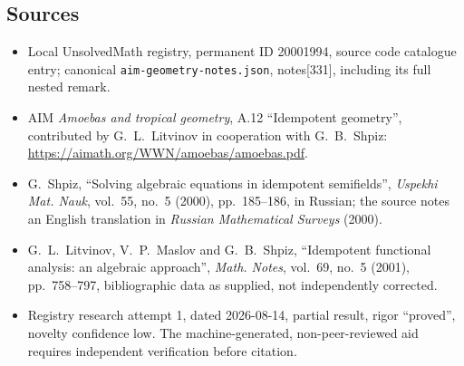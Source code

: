 \documentclass[11pt]{article}
\begin{document}
\subsection{Sources}
\begin{itemize}
\item Local UnsolvedMath registry, permanent ID 20001994, source code catalogue entry; canonical \texttt{aim-geometry-notes.json}, notes[331], including its full nested remark.
\item AIM \emph{Amoebas and tropical geometry}, A.12 ``Idempotent geometry'', contributed by G.~L.~Litvinov in cooperation with G.~B.~Shpiz: \url{https://aimath.org/WWN/amoebas/amoebas.pdf}.
\item G.~Shpiz, ``Solving algebraic equations in idempotent semifields'', \emph{Uspekhi Mat. Nauk}, vol.~55, no.~5 (2000), pp.~185--186, in Russian; the source notes an English translation in \emph{Russian Mathematical Surveys} (2000).
\item G.~L.~Litvinov, V.~P.~Maslov and G.~B.~Shpiz, ``Idempotent functional analysis: an algebraic approach'', \emph{Math. Notes}, vol.~69, no.~5 (2001), pp.~758--797, bibliographic data as supplied, not independently corrected.
\item Registry research attempt 1, dated 2026-08-14, partial result, rigor ``proved'', novelty confidence low. The machine-generated, non-peer-reviewed aid requires independent verification before citation.
\end{itemize}
\end{document}
